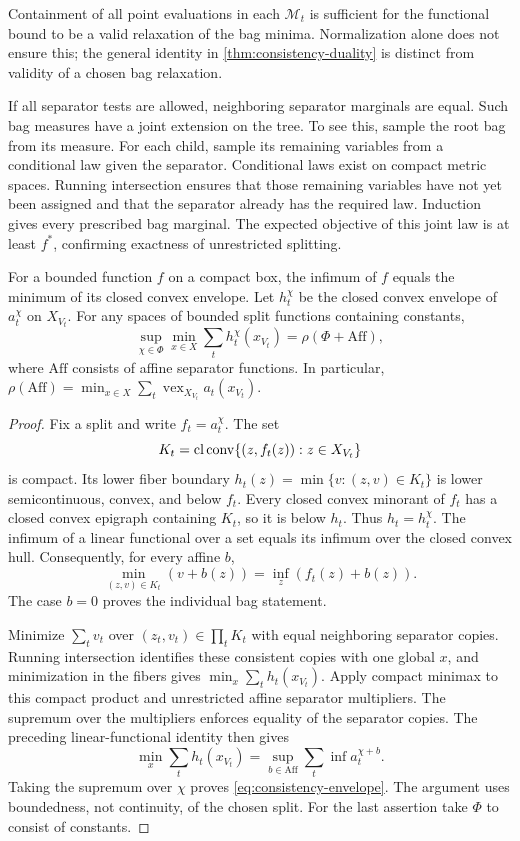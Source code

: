 Containment of all point evaluations in each $\mathcal M_t$ is sufficient
for the functional bound to be a valid relaxation of the bag minima.
Normalization alone does not ensure this; the general identity in
\cref{thm:consistency-duality} is distinct from validity of a chosen bag
relaxation.

If all separator tests are allowed, neighboring separator marginals are
equal.  Such bag measures have a joint extension on the tree.  To see
this, sample the root bag from its measure.  For each child, sample its
remaining variables from a conditional law given the separator.
Conditional laws exist on compact metric spaces.  Running intersection
ensures that those remaining variables have not yet been assigned and
that the separator already has the required law.  Induction gives every
prescribed bag marginal.  The expected objective of this joint law is at
least $f^*$, confirming exactness of unrestricted splitting.

\begin{proposition}
\label{prop:consistency-envelope}
For a bounded function $f$ on a compact box, the infimum of $f$ equals
the minimum of its closed convex envelope.
Let $h_t^\chi$ be the closed convex envelope of $a_t^\chi$ on $X_{V_t}$.
For any spaces of bounded split functions containing constants,
\begin{equation}
\label{eq:consistency-envelope}
 \sup_{\chi\in\Phi}\min_{x\in X}\sum_t h_t^\chi(x_{V_t})
 =\rho(\Phi+\mathrm{Aff}),
\end{equation}
where $\mathrm{Aff}$ consists of affine separator functions.
In particular,
$\rho(\mathrm{Aff})=\min_{x\in X}\sum_t\operatorname{vex}_{X_{V_t}}a_t(x_{V_t})$.
\end{proposition}

\begin{proof}
Fix a split and write $f_t=a_t^\chi$.  The set
\[
 K_t=\operatorname{cl}\operatorname{conv}\{(z,f_t(z)):z\in X_{V_t}\}
\]
is compact.  Its lower fiber boundary
$h_t(z)=\min\{v:(z,v)\in K_t\}$ is lower semicontinuous, convex, and
below $f_t$.  Every closed convex minorant of $f_t$ has a closed convex
epigraph containing $K_t$, so it is below $h_t$.  Thus $h_t=h_t^\chi$.
The infimum of a linear functional over a set equals its infimum over
the closed convex hull.  Consequently, for every affine $b$,
\[
 \min_{(z,v)\in K_t}(v+b(z))=\inf_z(f_t(z)+b(z)).
\]
The case $b=0$ proves the individual bag statement.

Minimize $\sum_tv_t$ over $(z_t,v_t)\in\prod_tK_t$ with equal neighboring
separator copies.  Running intersection identifies these consistent
copies with one global $x$, and minimization in the fibers gives
$\min_x\sum_th_t(x_{V_t})$.
Apply compact minimax to this compact product and unrestricted affine
separator multipliers.  The supremum over the multipliers enforces
equality of the separator copies.  The preceding linear-functional
identity then gives
\[
 \min_x\sum_th_t(x_{V_t})
 =\sup_{b\in\mathrm{Aff}}\sum_t\inf a_t^{\chi+b}.
\]
Taking the supremum over $\chi$ proves \cref{eq:consistency-envelope}.
The argument uses boundedness, not continuity, of the chosen split.
For the last assertion take $\Phi$ to consist of constants.
\end{proof}

